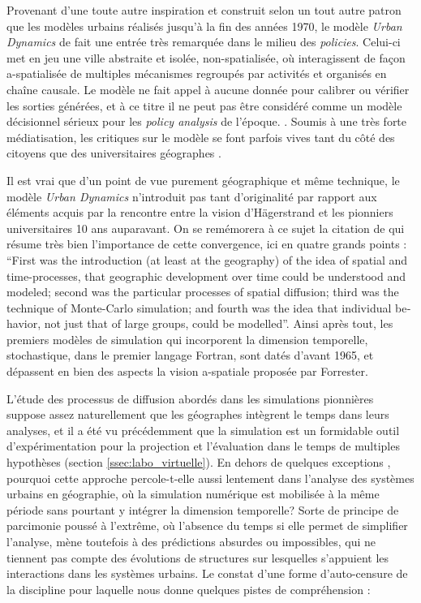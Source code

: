 Provenant d'une toute autre inspiration et construit selon un tout autre patron que les modèles urbains réalisés jusqu'à la fin des années 1970, le modèle \textit{Urban Dynamics} de \textcite{Forrester1969} fait une entrée très remarquée dans le milieu des \textit{policies}. Celui-ci met en jeu une ville abstraite et isolée, non-spatialisée, où interagissent de façon a-spatialisée de multiples mécanismes regroupés par activités et organisés en chaîne causale. Le modèle ne fait appel à aucune donnée pour calibrer ou vérifier les sorties générées, et à ce titre il ne peut pas être considéré comme un modèle décisionnel sérieux pour les \textit{policy analysis} de l'époque. \autocite{Lee1973}. Soumis à une très forte médiatisation, les critiques sur le modèle se font parfois vives tant du côté des citoyens \autocites{Forrester1989, Forrester2007} que des universitaires géographes \autocites{Tobler1970a, Berry1970b, Batty1971, Batty1976} .

Il est vrai que d'un point de vue purement géographique et même technique, le modèle \textit{Urban Dynamics} n'introduit pas tant d'originalité par rapport aux éléments acquis par la rencontre entre la vision d'Hägerstrand et les pionniers universitaires 10 ans auparavant. On se remémorera à ce sujet la citation de \textcite{Morril2005} qui résume très bien l'importance de cette convergence, ici en quatre grands points : \foreignquote{english}{First was the introduction (at least at the geography) of the idea of spatial and time-processes, that geographic development over time could be understood and modeled; second was the particular processes of spatial diffusion; third was the technique of Monte-Carlo simulation; and fourth was the idea that individual behavior, not just that of large groups, could be modelled}. Ainsi après tout, les premiers modèles de simulation qui incorporent la dimension temporelle, stochastique, dans le premier langage Fortran, sont datés d'avant 1965, et dépassent en bien des aspects la vision a-spatiale proposée par Forrester.

L'étude des processus de diffusion abordés dans les simulations pionnières suppose assez naturellement que les géographes intègrent le temps dans leurs analyses, et il a été vu précédemment que la simulation est un formidable outil d'expérimentation pour la projection et l'évaluation dans le temps de multiples hypothèses (section \ref{ssec:labo_virtuelle}). En dehors de quelques exceptions , pourquoi cette approche percole-t-elle aussi lentement dans l'analyse des systèmes urbains en géographie, où la simulation numérique est mobilisée à la même période sans pourtant y intégrer la dimension temporelle? Sorte de principe de parcimonie poussé à l'extrême, où l'absence du temps si elle permet de simplifier l'analyse, mène toutefois à des prédictions absurdes ou impossibles, qui ne tiennent pas compte des évolutions de structures sur lesquelles s'appuient les interactions dans les systèmes urbains. Le constat d'une forme d'auto-censure de la discipline pour laquelle \textcite[296-297]{Batty1976} nous donne quelques pistes de compréhension :

